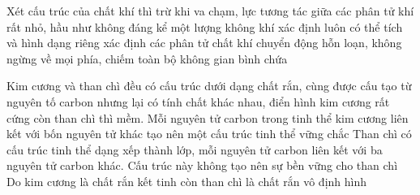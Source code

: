 \begin{ex} 
	Xét cấu trúc của chất khí thì
	{\True trừ khi va chạm, lực tương tác giữa các phân tử khí rất nhỏ, hầu như không đáng kể}
	{một lượng không khí xác định luôn có thể tích và hình dạng riêng xác định}
	{\True các phân tử chất khí chuyển động hỗn loạn, không ngừng về mọi phía, chiếm toàn bộ không gian bình chứa}
\end{ex}


\begin{ex} 
	Kim cương và than chì đều có cấu trúc dưới dạng chất rắn, cùng được cấu tạo từ nguyên tố carbon nhưng lại có tính chất khác nhau, điển hình kim cương rất cứng còn than chì thì mềm. 
	{\True Mỗi nguyên tử carbon trong tinh thể kim cương liên kết với bốn nguyên tử khác tạo nên một cấu trúc tinh thể vững chắc}
	{\True Than chì có cấu trúc tinh thể dạng xếp thành lớp, mỗi nguyên tử carbon liên kết với ba nguyên tử carbon khác. Cấu trúc này không tạo nên sự bền vững cho than chì}
	{Do kim cương là chất rắn kết tinh còn than chì là chất rắn vô định hình}
	\loigiai{
		\begin{itemchoice}
			\itemch 
			\itemch 
			\itemch 
			\itemch 
		\end{itemchoice}
	}
\end{ex}